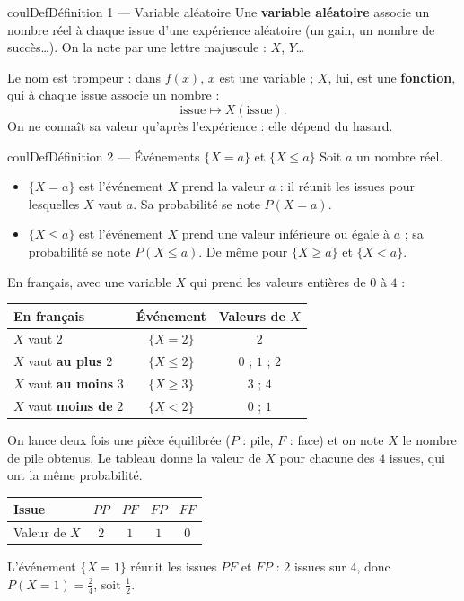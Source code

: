 \documentclass[11pt,a4paper]{article}
\makeatletter
\renewcommand{\le}{\leqslant}
\renewcommand{\ge}{\geqslant}
\newcounter{lycee@signet}
\newcommand{\signet}[3][]{\stepcounter{lycee@signet}%
  \edef\lycee@dest{\if\relax\detokenize{#1}\relax
    signet.\arabic{lycee@signet}\else#1\fi}%
  \hypertarget{\lycee@dest}{}\bookmark[level=#2,dest=\lycee@dest]{#3}}
\newenvironment{definitionbox}[1][Définition]%
  {\begin{boitecours}[phantom={\signet{2}{#1}}]{coulDef}{#1}}{\end{boitecours}}
\makeatother
\begin{document}
\begin{definitionbox}[Définition 1 --- Variable aléatoire]
Une \textbf{variable aléatoire} associe un nombre réel à chaque issue d'une expérience
aléatoire (un gain, un nombre de succès\dots). On la note par une lettre majuscule : $X$,
$Y$\dots
\end{definitionbox}

\begin{remarquebox}
Le nom est trompeur : dans $f(x)$, $x$ est une variable ; $X$, lui, est une
\textbf{fonction}, qui à chaque issue associe un nombre :
\[
\text{issue}\longmapsto X(\text{issue}).
\]
On ne connaît sa valeur qu'après l'expérience : elle dépend du hasard.
\end{remarquebox}

\begin{definitionbox}[Définition 2 --- Événements $\{X=a\}$ et $\{X\le a\}$]
Soit $a$ un nombre réel.
\begin{itemize}
  \item $\{X=a\}$ est l'événement \og $X$ prend la valeur $a$\fg{} : il réunit les issues
        pour lesquelles $X$ vaut $a$. Sa probabilité se note $P(X=a)$.
  \item $\{X\le a\}$ est l'événement \og $X$ prend une valeur inférieure ou égale à
        $a$\fg{} ; sa probabilité se note $P(X\le a)$. De même pour $\{X\ge a\}$ et
        $\{X<a\}$.
\end{itemize}
En français, avec une variable $X$ qui prend les valeurs entières de $0$ à $4$ :
\begin{center}
\renewcommand{\arraystretch}{1.4}
\begin{tabular}{|l|c|c|}
\hline
En français & Événement & Valeurs de $X$\\
\hline
$X$ vaut $2$ & $\{X=2\}$ & $2$\\
$X$ vaut \textbf{au plus} $2$ & $\{X\le 2\}$ & $0$ ; $1$ ; $2$\\
$X$ vaut \textbf{au moins} $3$ & $\{X\ge 3\}$ & $3$ ; $4$\\
$X$ vaut \textbf{moins de} $2$ & $\{X<2\}$ & $0$ ; $1$\\
\hline
\end{tabular}
\end{center}
\end{definitionbox}

\begin{exemplebox}
On lance deux fois une pièce équilibrée ($P$ : pile, $F$ : face) et on note $X$ le
nombre de \og pile\fg{} obtenus. Le tableau donne la valeur de $X$ pour chacune des $4$
issues, qui ont la même probabilité.
\begin{center}
\renewcommand{\arraystretch}{1.4}
\begin{tabular}{|l|c|c|c|c|}
\hline
Issue & $PP$ & $PF$ & $FP$ & $FF$\\
\hline
Valeur de $X$ & $2$ & $1$ & $1$ & $0$\\
\hline
\end{tabular}
\end{center}
L'événement $\{X=1\}$ réunit les issues $PF$ et $FP$ : $2$ issues sur $4$, donc
$P(X=1)=\frac{2}{4}$, soit $\frac{1}{2}$.
\end{exemplebox}
\end{document}
